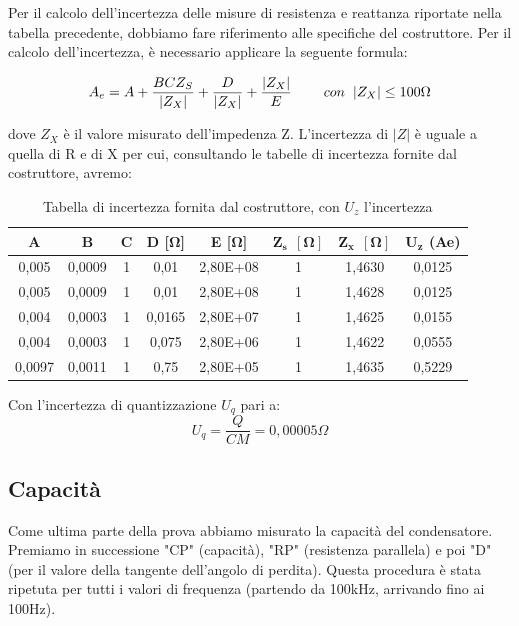 Per il calcolo dell'incertezza delle misure di resistenza e reattanza riportate nella tabella precedente, dobbiamo fare riferimento alle specifiche del costruttore. Per il calcolo dell'incertezza, è necessario applicare la seguente formula:

\begin{equation}
    A_e = A + \frac{BCZ_S}{|Z_X|} + \frac{D}{|Z_X|} + \frac{|Z_X|}{E} \hspace{0,8cm} con \hspace{0,2cm} |Z_X| \leq 100\Omega
\end{equation}

dove $Z_X$ è il valore misurato dell’impedenza Z. L’incertezza di $|Z|$ è uguale a quella di 
R e di X per cui, consultando le tabelle di incertezza fornite dal costruttore, avremo:



\begin{table}[!ht]
\centering
\begin{tabular}{|c|c|c|c|c|c|c|c|}
\hline
\textbf{A}      & \textbf{B}      & \textbf{C} & \textbf{D [$\bm{\Omega}$]} & \textbf{E [$\bm{\Omega}$]}  & $\bm{Z_s \ \ [\Omega]}$ & $\bm{Z_x \ \ [\Omega]}$ & $\bm{U_z}$ \textbf{(Ae)} \\ \hline
0,005  & 0,0009 & 1 & 0,01      & 2,80E+08  & 1          & 1,4630     & 0,0125  \\ \hline
0,005  & 0,0009 & 1 & 0,01      & 2,80E+08  & 1          & 1,4628     & 0,0125  \\ \hline
0,004  & 0,0003 & 1 & 0,0165    & 2,80E+07  & 1          & 1,4625     & 0,0155  \\ \hline
0,004  & 0,0003 & 1 & 0,075     & 2,80E+06  & 1          & 1,4622     & 0,0555  \\ \hline
0,0097 & 0,0011 & 1 & 0,75      & 2,80E+05  & 1          & 1,4635     & 0,5229  \\ \hline
\end{tabular}
\caption{Tabella di incertezza fornita dal costruttore, con $U_z$ l'incertezza}
\label{tab:lcr_z_sheet}
\end{table}
\FloatBarrier

Con l'incertezza di quantizzazione $U_q$ pari a:
\begin{equation}
    U_q = \frac{Q}{CM} = 0,00005 \Omega
\end{equation}



\subsection{Capacità}
\label{sub:c}
Come ultima parte della prova abbiamo misurato la capacità del condensatore.
Premiamo in successione "CP" (capacità), "RP" (resistenza parallela) e poi "D" (per il valore della tangente dell'angolo di perdita). Questa procedura è stata ripetuta per tutti i valori di frequenza (partendo da 100kHz, arrivando fino ai 100Hz).


